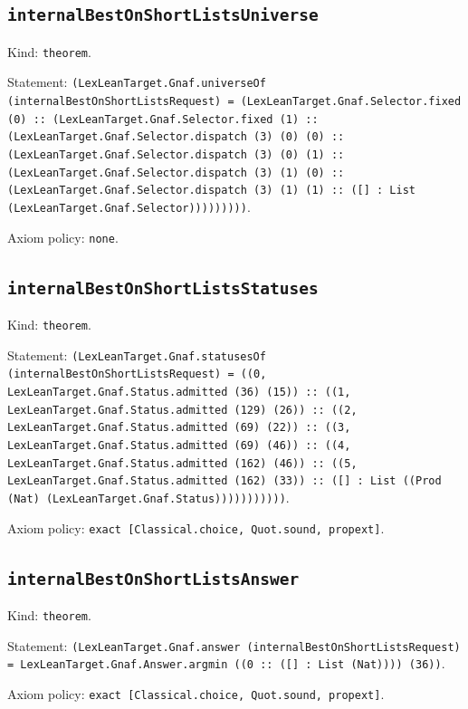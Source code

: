 \documentclass[11pt]{article}
\begin{document}
\subsection*{\texttt{internalBestOnShortListsUniverse}}
\noindent Kind: \texttt{theorem}.\par
\noindent Statement: \texttt{(LexLeanTarget.Gnaf.universeOf (internalBestOnShortListsRequest) = (LexLeanTarget.Gnaf.Selector.fixed (0) :: (LexLeanTarget.Gnaf.Selector.fixed (1) :: (LexLeanTarget.Gnaf.Selector.dispatch (3) (0) (0) :: (LexLeanTarget.Gnaf.Selector.dispatch (3) (0) (1) :: (LexLeanTarget.Gnaf.Selector.dispatch (3) (1) (0) :: (LexLeanTarget.Gnaf.Selector.dispatch (3) (1) (1) :: ([] : List (LexLeanTarget.Gnaf.Selector)))))))))}.\par
\noindent Axiom policy: \texttt{none}.\par
\subsection*{\texttt{internalBestOnShortListsStatuses}}
\noindent Kind: \texttt{theorem}.\par
\noindent Statement: \texttt{(LexLeanTarget.Gnaf.statusesOf (internalBestOnShortListsRequest) = ((0, LexLeanTarget.Gnaf.Status.admitted (36) (15)) :: ((1, LexLeanTarget.Gnaf.Status.admitted (129) (26)) :: ((2, LexLeanTarget.Gnaf.Status.admitted (69) (22)) :: ((3, LexLeanTarget.Gnaf.Status.admitted (69) (46)) :: ((4, LexLeanTarget.Gnaf.Status.admitted (162) (46)) :: ((5, LexLeanTarget.Gnaf.Status.admitted (162) (33)) :: ([] : List ((Prod (Nat) (LexLeanTarget.Gnaf.Status)))))))))))}.\par
\noindent Axiom policy: \texttt{exact [Classical.choice, Quot.sound, propext]}.\par
\subsection*{\texttt{internalBestOnShortListsAnswer}}
\noindent Kind: \texttt{theorem}.\par
\noindent Statement: \texttt{(LexLeanTarget.Gnaf.answer (internalBestOnShortListsRequest) = LexLeanTarget.Gnaf.Answer.argmin ((0 :: ([] : List (Nat)))) (36))}.\par
\noindent Axiom policy: \texttt{exact [Classical.choice, Quot.sound, propext]}.\par
\end{document}

